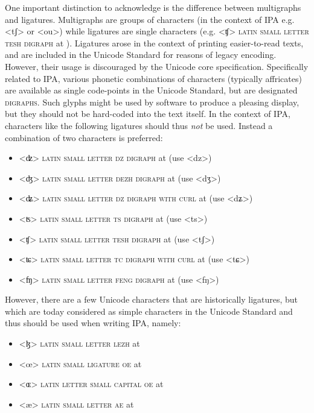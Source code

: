 One important distinction to acknowledge is the difference between multigraphs
and ligatures. Multigraphs are groups of characters (in the context of IPA e.g.
<tʃ> or <ou>) while ligatures are single characters (e.g. <ʧ> \textsc{latin
small letter tesh digraph} at ). Ligatures arose in the context of
printing easier-to-read texts, and are included in the Unicode Standard for
reasons of legacy encoding. However, their usage is discouraged by the Unicode
core specification. Specifically related to IPA, various phonetic combinations
of characters (typically affricates) are available as single code-points in the
Unicode Standard, but are designated \textsc{digraphs}. Such glyphs might be used by
software to produce a pleasing display, but they should not be hard-coded into
the text itself. In the context of IPA, characters like the following ligatures
should thus \emph{not} be used. Instead a combination of two characters is
preferred:
      
\begin{itemize} 
	\item[] <ʣ> \textsc{latin small letter dz digraph} at  
	  (use <dz>) 
    \item[] <ʤ> \textsc{latin small letter dezh digraph} at 
      (use <dʒ>)
    \item[] <ʥ> \textsc{latin small letter dz digraph with curl} at 
      (use <dʑ>)
    \item[] <ʦ> \textsc{latin small letter ts digraph} at  
      (use <ts>)
	\item[] <ʧ> \textsc{latin small letter tesh digraph} at  
	  (use <tʃ>) 
    \item[] <ʨ> \textsc{latin small letter tc digraph with curl} at 
      (use <tɕ>)
   	\item[] <ʩ> \textsc{latin small letter feng digraph} at 
	  (use <fŋ>) 
\end{itemize}

However, there are a few Unicode characters that are historically ligatures, but
which are today considered as simple characters in the Unicode Standard and thus
should be used when writing IPA, namely:

\begin{itemize}
	\item[] <ɮ> \textsc{latin small letter lezh} at  
	\item[] <œ> \textsc{latin small ligature oe} at  
	\item[] <ɶ> \textsc{latin letter small capital oe} at  
	\item[] <æ> \textsc{latin small letter ae} at  
\end{itemize}


